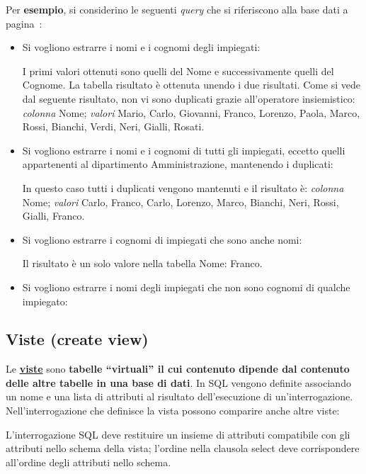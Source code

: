 \documentclass[a4paper]{article}
\newcommand{\dquotes}[1]{``#1''}
\begin{document}
	\noindent
	Per \textcolor{Green4}{\textbf{esempio}}, si considerino le seguenti \emph{query} che si riferiscono alla base dati a pagina~\pageref{select dbms}:
	\begin{itemize}
		\item Si vogliono estrarre i nomi e i cognomi degli impiegati:
		
		I primi valori ottenuti sono quelli del \textsf{Nome} e successivamente quelli del \textsf{Cognome}. La tabella risultato è ottenuta unendo i due risultati. Come si vede dal seguente risultato, non vi sono duplicati grazie all'operatore insiemistico: \emph{colonna} \textsf{Nome}; \emph{valori} \textsf{Mario, Carlo, Giovanni, Franco, Lorenzo, Paola, Marco, Rossi, Bianchi, Verdi, Neri, Gialli, Rosati}.\newpage
		
		\item Si vogliono estrarre i nomi e i cognomi di tutti gli impiegati, eccetto quelli appartenenti al dipartimento Amministrazione, mantenendo i duplicati:
		
		In questo caso tutti i duplicati vengono mantenuti e il risultato è: \emph{colonna} \textsf{Nome}; \emph{valori} \textsf{Carlo, Franco, Carlo, Lorenzo, Marco, Bianchi, Neri, Rossi, Gialli, Franco}.
		
		\item Si vogliono estrarre i cognomi di impiegati che sono anche nomi:
		
		Il risultato è un solo valore nella tabella \textsf{Nome}: \textsf{Franco}.
		
		\item Si vogliono estrarre i nomi degli impiegati che non sono cognomi di qualche impiegato:
		
	\end{itemize}\newpage
	
	\subsection{Viste (\textsf{create view})}
	
	Le \textbf{\underline{viste}} sono \textbf{tabelle \dquotes{virtuali} il cui contenuto dipende dal contenuto delle altre tabelle in una base di dati}. In SQL vengono definite associando un nome e una lista di attributi al risultato dell'esecuzione di un'interrogazione. Nell'interrogazione che definisce la vista possono comparire anche altre viste:
	
	L'interrogazione SQL deve restituire un insieme di attributi compatibile con gli attributi nello schema della vista; l'ordine nella clausola \textsf{select} deve corrispondere all'ordine degli attributi nello schema.\newline
	
\end{document}
